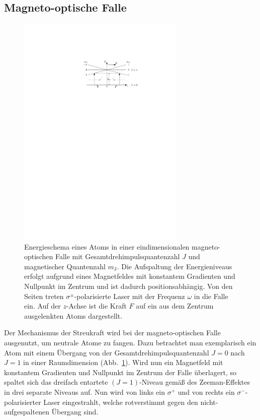 \documentclass[twocolumn]{revtex4}
\begin{document}
\subsection{Magneto-optische Falle}
\begin{figure}[t]
	\centering
	\vspace{0.5cm}
	\includegraphics[width=80mm]{./figures/mot_gesamt_resize.pdf}
	\caption{Energieschema eines Atoms in einer eindimensionalen magneto-optischen Falle mit Gesamtdrehimpulsquantenzahl $J$ und magnetischer Quantenzahl $m_\mathrm{J}$. Die Aufspaltung der Energieniveaus erfolgt aufgrund eines Magnetfeldes mit konstantem Gradienten und Nullpunkt im Zentrum und ist dadurch positionsabhängig. Von den Seiten treten $\sigma^\pm$-polarisierte Laser mit der Frequenz $\omega$ in die Falle ein. Auf der $z$-Achse ist die Kraft $F$ auf ein aus dem Zentrum ausgelenkten Atoms dargestellt.}
	\label{fig:mot}
	\vspace{-0.5cm}
\end{figure}
Der Mechanismus der Streukraft wird bei der magneto-optischen Falle ausgenutzt, um neutrale Atome zu fangen.
Dazu betrachtet man exemplarisch ein Atom mit einem Übergang von der Gesamtdrehimpulsquantenzahl $J=0$ nach $J=1$ in einer Raumdimension (Abb.~\ref{fig:mot}).
Wird nun ein Magnetfeld mit konstantem Gradienten und Nullpunkt im Zentrum der Falle überlagert, so spaltet sich das dreifach entartete $(J=1)$-Niveau gemäß des Zeeman-Effektes in drei separate Niveaus auf.
Nun wird von links ein $\sigma^+$ und von rechts ein $\sigma^-$-polarisierter Laser eingestrahlt, welche rotverstimmt gegen den nicht-aufgespaltenen Übergang sind.
\end{document}
